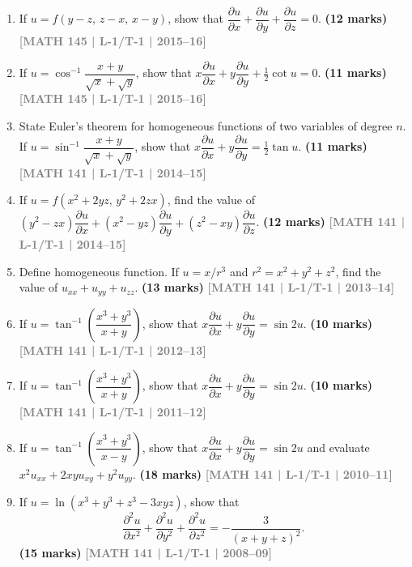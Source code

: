 \documentclass[12pt,a4paper]{article}
\newcommand{\yr}[1]{\hfill\textcolor{gray}{\small\textbf{[#1]}}}
\newcommand{\mk}[1]{\textcolor{orange!70!black}{\small\textbf{(#1 marks)}}}
\begin{document}
\begin{enumerate}
\item If $u=f(y-z,\,z-x,\,x-y)$, show that $\dfrac{\partial u}{\partial x}+\dfrac{\partial u}{\partial y}+\dfrac{\partial u}{\partial z}=0$.
\mk{12} \yr{MATH 145 | L-1/T-1 | 2015--16}

\item If $u=\cos^{-1}\!\dfrac{x+y}{\sqrt{x}+\sqrt{y}}$, show that $x\dfrac{\partial u}{\partial x}+y\dfrac{\partial u}{\partial y}+\tfrac{1}{2}\cot u=0$.
\mk{11} \yr{MATH 145 | L-1/T-1 | 2015--16}

\item State Euler's theorem for homogeneous functions of two variables of degree $n$. If $u=\sin^{-1}\!\dfrac{x+y}{\sqrt{x}+\sqrt{y}}$, show that $x\dfrac{\partial u}{\partial x}+y\dfrac{\partial u}{\partial y}=\tfrac{1}{2}\tan u$.
\mk{11} \yr{MATH 141 | L-1/T-1 | 2014--15}

\item If $u=f(x^{2}+2yz,\,y^{2}+2zx)$, find the value of $(y^{2}-zx)\dfrac{\partial u}{\partial x}+(x^{2}-yz)\dfrac{\partial u}{\partial y}+(z^{2}-xy)\dfrac{\partial u}{\partial z}$.
\mk{12} \yr{MATH 141 | L-1/T-1 | 2014--15}

\item Define homogeneous function. If $u=x/r^{3}$ and $r^{2}=x^{2}+y^{2}+z^{2}$, find the value of $u_{xx}+u_{yy}+u_{zz}$.
\mk{13} \yr{MATH 141 | L-1/T-1 | 2013--14}

\item If $u=\tan^{-1}\!\left(\dfrac{x^{3}+y^{3}}{x+y}\right)$, show that $x\dfrac{\partial u}{\partial x}+y\dfrac{\partial u}{\partial y}=\sin 2u$.
\mk{10} \yr{MATH 141 | L-1/T-1 | 2012--13}

\item If $u=\tan^{-1}\!\left(\dfrac{x^{3}+y^{3}}{x+y}\right)$, show that $x\dfrac{\partial u}{\partial x}+y\dfrac{\partial u}{\partial y}=\sin 2u$.
\mk{10} \yr{MATH 141 | L-1/T-1 | 2011--12}

\item If $u=\tan^{-1}\!\left(\dfrac{x^{3}+y^{3}}{x-y}\right)$, show that $x\dfrac{\partial u}{\partial x}+y\dfrac{\partial u}{\partial y}=\sin 2u$ and evaluate $x^{2}u_{xx}+2xyu_{xy}+y^{2}u_{yy}$.
\mk{18} \yr{MATH 141 | L-1/T-1 | 2010--11}

\item If $u=\ln(x^{3}+y^{3}+z^{3}-3xyz)$, show that
\[
\frac{\partial^{2}u}{\partial x^{2}}+\frac{\partial^{2}u}{\partial y^{2}}+\frac{\partial^{2}u}{\partial z^{2}}=-\frac{3}{(x+y+z)^{2}}.
\]
\mk{15} \yr{MATH 141 | L-1/T-1 | 2008--09}


\end{enumerate}
\end{document}
